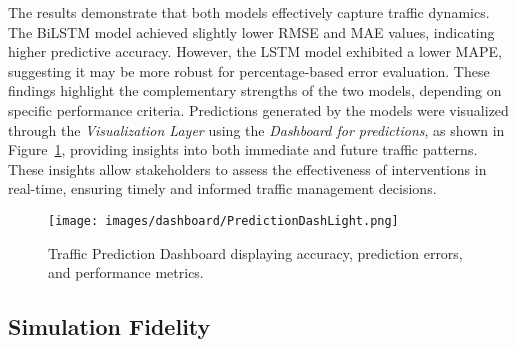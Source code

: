 \noindent The results demonstrate that both models effectively capture traffic dynamics. The BiLSTM model achieved slightly lower RMSE and MAE values, indicating higher predictive accuracy. However, the LSTM model exhibited a lower MAPE, suggesting it may be more robust for percentage-based error evaluation. These findings highlight the complementary strengths of the two models, depending on specific performance criteria. Predictions generated by the models were visualized through the \textit{Visualization Layer} using the \textit{Dashboard for predictions}, as shown in Figure~\ref{fig:traffic_prediction_dashboard}, providing insights into both immediate and future traffic patterns. These insights allow stakeholders to assess the effectiveness of interventions in real-time, ensuring timely and informed traffic management decisions.
\begin{figure}[ht!]
    \centering
    \texttt{[image: images/dashboard/PredictionDashLight.png]}
    \caption{Traffic Prediction Dashboard displaying accuracy, prediction errors, and performance metrics.}
    \label{fig:traffic_prediction_dashboard}
\end{figure}


\subsection{Simulation Fidelity}  

